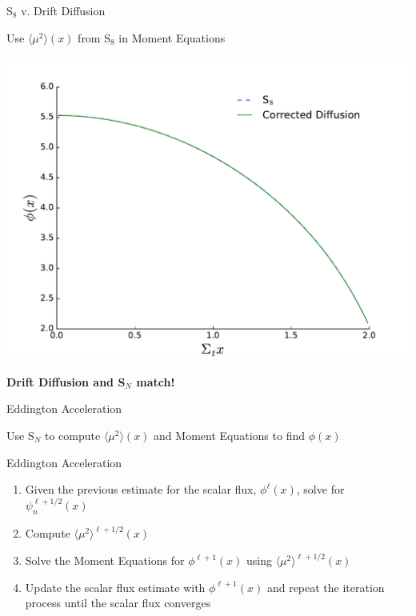 \documentclass[10pt]{beamer}
\newcommand{\SN}{S$_N$\xspace}
\newcommand{\edd}{\langle \mu^2 \rangle}
\begin{document}
\begin{frame}{S$_8$ v. Drift Diffusion}

	Use $\edd(x)$ from S$_8$ in Moment Equations
	\begin{center}
	\includegraphics[width=.5\paperwidth]{figs/corrected.pdf}
	\end{center}

	\centerline{\textbf{Drift Diffusion and \SN match!}}

\end{frame}

\begin{frame}{Eddington Acceleration}

    Use \SN to compute $\edd(x)$ and Moment Equations to find $\phi(x)$ 

    \begin{exampleblock}{Eddington Acceleration}
    \begin{enumerate}
        \item Given the previous estimate for the scalar flux, $\phi^{\ell}(x)$, solve for $\psi_n^{\ell+1/2}(x)$

        \item \alert{Compute $\edd^{\ell+1/2}(x)$ }

        \item \alert{Solve the Moment Equations for $\phi^{\ell+1}(x)$ 
        	using $\edd^{\ell+1/2}(x)$} 

        \item Update the scalar flux estimate with $\phi^{\ell+1}(x)$ and repeat the iteration process until the scalar flux converges
    \end{enumerate}
    \end{exampleblock}

\end{frame}
\end{document}
